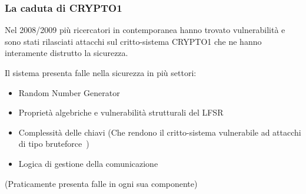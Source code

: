 \begin{frame}
    \frametitle{La caduta di CRYPTO1}
    Nel 2008/2009 più ricercatori in contemporanea hanno trovato vulnerabilità e sono stati rilasciati attacchi sul critto-sistema CRYPTO1
    che ne hanno interamente distrutto la sicurezza.\cite{garcia2008dismantling}\cite{courtois2008algebraic}\cite{nohl2008reverse}\pause

    Il sistema presenta falle nella sicurezza in più settori:

    \begin{itemize}
        \item <2-> Random Number Generator
        \item <3-> Proprietà algebriche e vulnerabilità strutturali del LFSR
        \item <4-> Complessità delle chiavi (Che rendono il critto-sistema vulnerabile ad attacchi di tipo bruteforce~\cite{courtois2008algebraic})
        \item <5-> Logica di gestione della comunicazione
    \end{itemize}

    (Praticamente presenta falle in ogni sua componente)
\end{frame}


